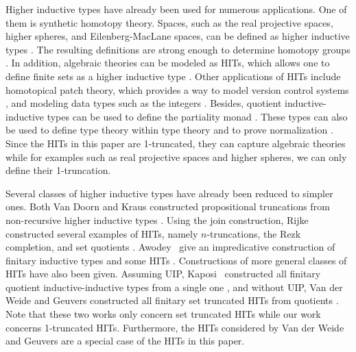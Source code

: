Higher inductive types have already been used for numerous applications.
One of them is synthetic homotopy theory.
Spaces, such as the real projective spaces, higher spheres, and Eilenberg-MacLane spaces,
can be defined as higher inductive types \cite{licata2013pi,LicataF14,DBLP:conf/lics/BuchholtzR17,hottbook}.
The resulting definitions are strong enough to determine homotopy groups
\cite{licata2013pi,LicataS13}.
In addition, algebraic theories can be modeled as HITs, which allows one
to define finite sets as a higher inductive type \cite{frumin2018finite}.
Other applications of HITs include homotopical patch theory, which provides a way
to model version control systems \cite{AngiuliMLH16}, and modeling data types
such as the integers \cite{BasoldGW17,altenkirchscoccola}.
Besides, quotient inductive-inductive types can be used to define the partiality monad \cite{AltenkirchDK17}.
These types can also be used to define type theory within type theory \cite{AltenkirchK16}
and to prove normalization \cite{DBLP:journals/lmcs/AltenkirchK17}.
Since the HITs in this paper are 1-truncated, they can capture algebraic theories
while for examples such as real projective spaces and higher spheres, we can only define their 1-truncation.

Several classes of higher inductive types have already been reduced to simpler ones.
Both Van Doorn and Kraus constructed propositional truncations from non-recursive higher inductive types
\cite{Doorn16,Kraus16}.
Using the join construction, Rijke constructed several examples of HITs, namely $n$-truncations, the Rezk completion,
and set quotients \cite{rijke2017join}.
Awodey \etal \ give an impredicative construction of finitary inductive types and some HITs \cite{awodey2018impredicative}. 
Constructions of more general classes of HITs have also been given.
Assuming UIP, Kaposi \etal \ constructed all finitary quotient inductive-inductive types
from a single one \cite{KaposiKA19}, and without UIP, Van der Weide and Geuvers
constructed all finitary set truncated HITs from quotients \cite{van2019construction}.
Note that these two works only concern set truncated HITs while our work concerns 1-truncated HITs.
Furthermore, the HITs considered by Van der Weide and Geuvers are a special case of
the HITs in this paper.


